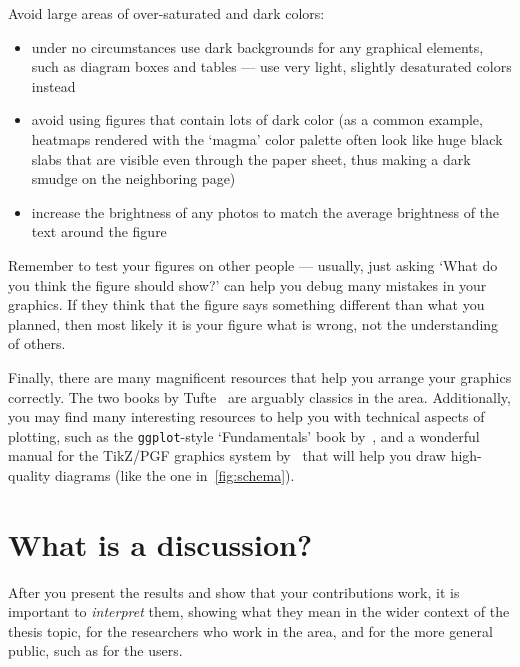 Avoid large areas of over-saturated and dark colors:
\begin{itemize}
  \item under no circumstances use dark backgrounds for any graphical elements, such as diagram boxes and tables --- use very light, slightly desaturated colors instead
  \item avoid using figures that contain lots of dark color (as a common example, heatmaps rendered with the `magma' color palette often look like huge black slabs that are visible even through the paper sheet, thus making a dark smudge on the neighboring page)
  \item increase the brightness of any photos to match the average brightness of the text around the figure
\end{itemize}

Remember to test your figures on other people --- usually, just asking `What do you think the figure should show?' can help you debug many mistakes in your graphics. If they think that the figure says something different than what you planned, then most likely it is your figure what is wrong, not the understanding of others.

Finally, there are many magnificent resources that help you arrange your graphics correctly. The two books by Tufte~\cite{tufte1990envisioning,tufte1983visual} are arguably classics in the area. Additionally, you may find many interesting resources to help you with technical aspects of plotting, such as the \texttt{ggplot}-style `Fundamentals' book by~\citet{wilke2019fundamentals}, and a wonderful manual for the TikZ/PGF graphics system by~\citet{tantau2015tikz} that will help you draw high-quality diagrams (like the one in~\cref{fig:schema}).

\section{What is a discussion?}
After you present the results and show that your contributions work, it is important to \emph{interpret} them, showing what they mean in the wider context of the thesis topic, for the researchers who work in the area, and for the more general public, such as for the users.

